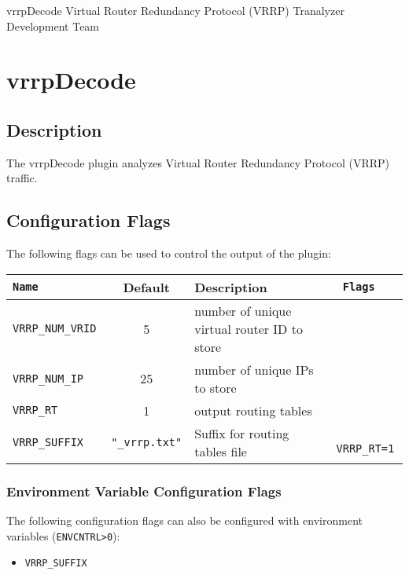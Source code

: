 \documentclass[documentation]{subfiles}
\begin{document}
\trantitle
    {vrrpDecode} %
    {Virtual Router Redundancy Protocol (VRRP)} %
    {Tranalyzer Development Team} %

\section{vrrpDecode}\label{s:vrrpDecode}

\subsection{Description}
The vrrpDecode plugin analyzes Virtual Router Redundancy Protocol (VRRP) traffic.


\subsection{Configuration Flags}
The following flags can be used to control the output of the plugin:
\begin{longtable}{>{\tt}lcl>{\tt\small}l}
    \toprule
    {\bf Name} & {\bf Default} & {\bf Description} & {\bf Flags}\\
    \midrule\endhead%
    VRRP\_NUM\_VRID &  5 & number of unique virtual router ID to store & \\
    VRRP\_NUM\_IP   & 25 & number of unique IPs to store               & \\
    VRRP\_RT        &  1 & output routing tables                       & \\
    VRRP\_SUFFIX    & {\tt\small "\_vrrp.txt"}
                         & Suffix for routing tables file              & VRRP\_RT=1\\
    \bottomrule
\end{longtable}

\subsubsection{Environment Variable Configuration Flags}
The following configuration flags can also be configured with environment variables ({\tt ENVCNTRL>0}):
\begin{itemize}
    \item {\tt VRRP\_SUFFIX}
\end{itemize}
\end{document}
